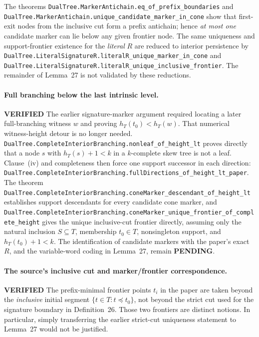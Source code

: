 \documentclass[11pt]{article}
\newcommand{\ok}{\textcolor{green!40!black}{\textbf{VERIFIED}}}
\newcommand{\todo}{\textcolor{gray!70!black}{\textbf{PENDING}}}
\newcommand{\lean}[1]{\texttt{#1}}
\begin{document}
The theorems
\lean{DualTree.MarkerAntichain.eq_of_prefix_boundaries} and
\lean{DualTree.MarkerAntichain.unique_candidate_marker_in_cone}
show that first-exit nodes from the inclusive cut form a prefix
antichain; hence \emph{at most one} candidate marker can lie below
any given frontier node.  The same uniqueness and support-frontier
existence for the \emph{literal} $R$ are reduced to interior persistence
by \lean{DualTree.LiteralSignatureR.literalR_unique_marker_in_cone}
and \lean{DualTree.LiteralSignatureR.literalR_unique_inclusive_frontier}.
The remainder of Lemma~27 is not validated by these reductions.

\paragraph{Full branching below the last intrinsic level.} \ok
The earlier signature-marker argument required locating a later
full-branching witness $w$ and proving $h_T(t_0)<h_T(w)$.  That
numerical witness-height detour is no longer needed.
\lean{DualTree.CompleteInteriorBranching.nonleaf_of_height_lt}
proves directly that a node $s$ with $h_T(s)+1<k$ in a $k$-complete
skew tree is not a leaf.  Clause~(iv) and completeness then force
one support successor in each direction:
\lean{DualTree.CompleteInteriorBranching.fullDirections_of_height_lt_paper}.
The theorem
\lean{DualTree.CompleteInteriorBranching.coneMarker_descendant_of_height_lt}
establishes support descendants for every candidate cone marker, and
\lean{DualTree.CompleteInteriorBranching.coneMarker_unique_frontier_of_complete_height}
gives the unique inclusive-cut frontier directly, assuming only the
natural inclusion $S\subseteq T$, membership $t_0\in T$, nonsingleton
support, and $h_T(t_0)+1<k$.
The identification of candidate markers with the paper's exact $R$,
and the variable-word coding in Lemma~27, remain \todo.

\paragraph{The source's inclusive cut and marker/frontier correspondence.} \ok
The prefix-minimal frontier points $t_i$ in the paper are taken beyond
the \emph{inclusive} initial segment $\{t\in T:t\preccurlyeq t_0\}$,
not beyond the strict cut used for the signature boundary in
Definition~26.  Those two frontiers are distinct notions.  In
particular, simply transferring the earlier strict-cut uniqueness
statement to Lemma~27 would not be justified.
\end{document}
